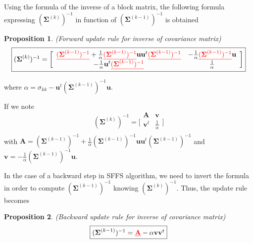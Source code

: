 \documentclass[a4paper,11pt,DIV=16]{scrartcl}
\newcommand*{\equl}[2]{%
    \textcolor{#1}{\underline{#2}}%
}
\newtheorem{prop}{Proposition}
\begin{document}
        Using the formula of the inverse of a block matrix, the following formula expressing $(\boldsymbol{\Sigma}^{(k)})^{-1}$ in function of $(\boldsymbol{\Sigma}^{(k-1)})^{-1}$ is obtained
        \begin{prop}
        \label{eq:update-inv}
            (Forward update rule for inverse of covariance matrix)
            \begin{equation*}
                \fbox{$
                (\boldsymbol{\Sigma}^{(k)})^{-1} =
                \bigg[\begin{array}{cc}
                \equl{red}{(\boldsymbol{\Sigma}^{(k-1)})^{-1}} + \frac{1}{\alpha} \equl{red}{(\boldsymbol{\Sigma}^{(k-1)})^{-1}} \mathbf{u} \mathbf{u}^t \equl{red}{(\boldsymbol{\Sigma}^{(k-1)})^{-1}} & - \frac{1}{\alpha} \equl{red}{(\boldsymbol{\Sigma}^{(k-1)})^{-1}} \mathbf{u} \\
                - \frac{1}{\alpha} \mathbf{u}^t \equl{red}{(\boldsymbol{\Sigma}^{(k-1)})^{-1}}                                                                          & \frac{1}{\alpha}                  \\
                \end{array}\bigg]
                $}
            \end{equation*}
        \end{prop}
        where $ \alpha = \sigma_{kk} - \mathbf{u}^t (\boldsymbol{\Sigma}^{(k-1)})^{-1} \mathbf{u} $.

        If we note
        \begin{equation*}
            (\boldsymbol{\Sigma}^{(k)})^{-1} =
            \bigg[\begin{array}{cc}
            \mathbf{A}   & \mathbf{v} \\
            \mathbf{v}^t & \frac{1}{\alpha} \\
            \end{array}\bigg]
        \end{equation*}
        with $\mathbf{A} = (\boldsymbol{\Sigma}^{(k-1)})^{-1} + \frac{1}{\alpha} (\boldsymbol{\Sigma}^{(k-1)})^{-1} \mathbf{u} \mathbf{u}^t (\boldsymbol{\Sigma}^{(k-1)})^{-1}$ and $\mathbf{v} = - \frac{1}{\alpha} (\boldsymbol{\Sigma}^{(k-1)})^{-1} \mathbf{u}$.

        In the case of a backward step in SFFS algorithm, we need to invert the formula in order to compute $(\boldsymbol{\Sigma}^{(k-1)})^{-1}$ knowing $(\boldsymbol{\Sigma}^{(k)})^{-1}$. Thus, the update rule becomes
        \begin{prop}
            (Backward update rule for inverse of covariance matrix)
            \begin{equation*}
                \fbox{$(\boldsymbol{\Sigma}^{(k-1)})^{-1} = \equl{red}{\mathbf{A}} - \alpha \mathbf{v} \mathbf{v}^t$}
            \end{equation*}
        \end{prop}
\end{document}
